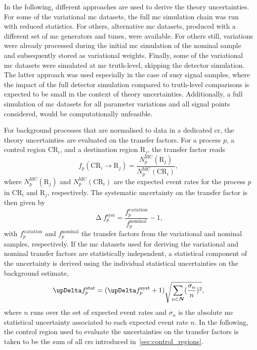 In the following, different approaches are used to derive the theory uncertainties.
For some of the variational \gls{mc} datasets, the full \gls{mc} simulation chain was run with reduced statistics.
For others, alternative \gls{mc} datasets, produced with a different set of \gls{mc} generators and tunes, were available.
For others still, variations were already processed during the initial \gls{mc} simulation of the nominal sample and subsequently stored as variational weights.
Finally, some of the variational \gls{mc} datasets were simulated at \gls{mc} truth-level, \ie skipping the detector simulation.
The latter approach was used especially in the case of \gls{susy} signal samples, where the impact of the full detector simulation compared to truth-level comparisons is expected to be small in the context of theory uncertainties.
Additionally, a full simulation of \gls{mc} datasets for all parameter variations and all signal points considered, would be computationally unfeasible. 

For background processes that are normalised to data in a dedicated \gls{cr}, the theory uncertainties are evaluated on the transfer factors.
For a process $p$, a control region CR$_i$, and a destination region R$_j$, the transfer factor reads
\begin{equation}
	f_p(\mathrm{CR}_i\rightarrow \mathrm{R}_j) = \frac{N^\mathrm{MC}_p(\mathrm{R}_j)}{N^\mathrm{MC}_p(\mathrm{CR}_i)},
\end{equation}
where $N^\mathrm{MC}_p(\mathrm{R}_j)$ and $N^\mathrm{MC}_p(\mathrm{CR}_i)$ are the expected event rates for the process $p$ in CR$_i$ and R$_j$, respectively. The systematic uncertainty on the transfer factor is then given by
\begin{equation}
	\upDelta f_p^\mathrm{syst} = \frac{f_p^\mathrm{variation}}{f_p^\mathrm{nominal}} - 1,
\end{equation}
with $f_p^\mathrm{variation}$ and $f_p^\mathrm{nominal}$ the transfer factors from the variational and nominal samples, respectively.
If the \gls{mc} datasets used for deriving the variational and nominal transfer factors are statistically independent, a statistical component of the uncertainty is derived using the individual statistical uncertainties on the background estimate,
\begin{equation}
	\upDelta f_p^\mathrm{stat} = (\upDelta f_p^\mathrm{syst} + 1 ) \sqrt{\sum_{n\in\makemebold{N}}(\frac{\sigma_n}{n})^2},
\end{equation}
 where $n$ runs over the set of expected event rates and $\sigma_n$ is the absolute \gls{mc} statistical uncertainty associated to each expected event rate $n$.
 In the following, the control region used to evaluate the uncertainties on the transfer factors is taken to be the sum of all \glspl{cr} introduced in~\cref{sec:control_regions}.
  
